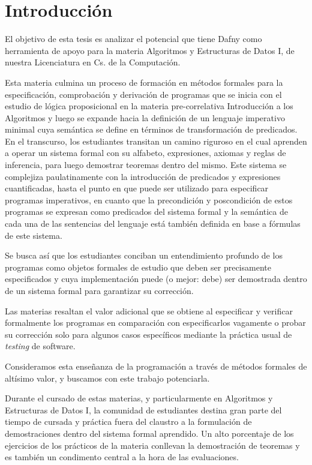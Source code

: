 \documentclass[12pt, a4paper, openany, fleqn]{book}
\begin{document}
    \chapter{Introducción}
    El objetivo de esta tesis es analizar el potencial que tiene Dafny como herramienta de apoyo para la materia Algoritmos y Estructuras de Datos I, de nuestra Licenciatura en Cs. de la Computación.

    Esta materia culmina un proceso de formación en métodos formales para la especificación, comprobación y derivación de programas que se inicia con el estudio de lógica proposicional en la materia pre-correlativa Introducción a los Algoritmos y luego se expande hacia la definición de un lenguaje imperativo minimal cuya semántica se define en términos de transformación de predicados.
    En el transcurso, los estudiantes transitan un camino riguroso en el cual aprenden a operar un sistema formal con su alfabeto, expresiones, axiomas y reglas de inferencia, para luego demostrar teoremas dentro del mismo. Este sistema se complejiza paulatinamente con la introducción de predicados y expresiones cuantificadas, hasta el punto en que puede ser utilizado para especificar programas imperativos, en cuanto que la precondición y poscondición de estos programas se expresan como predicados del sistema formal y la semántica de cada una de las sentencias del lenguaje está también definida en base a fórmulas de este sistema.

    Se busca así que los estudiantes conciban un entendimiento profundo de los programas como objetos formales de estudio que deben ser precisamente especificados y cuya implementación puede (o mejor: debe) ser demostrada dentro de un sistema formal para garantizar su corrección.

    Las materias resaltan el valor adicional que se obtiene al especificar y verificar formalmente los programas en comparación con especificarlos vagamente o probar su corrección solo para algunos casos específicos mediante la práctica usual de \textit{testing} de software.

    Consideramos esta enseñanza de la programación a través de métodos formales de altísimo valor, y buscamos con este trabajo potenciarla.

    Durante el cursado de estas materias, y particularmente en Algoritmos y Estructuras de Datos I, la comunidad de estudiantes destina gran parte del tiempo de cursada y práctica fuera del claustro a la formulación de demostraciones dentro del sistema formal aprendido. Un alto porcentaje de los ejercicios de los prácticos de la materia conllevan la demostración de teoremas y es también un condimento central a la hora de las evaluaciones.
\end{document}
